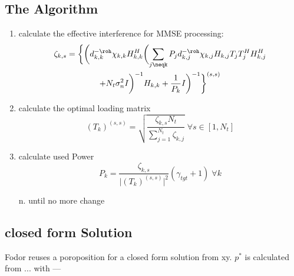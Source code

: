 \subsection{The Algorithm}
\begin{enumerate}
	\item calculate the effective interference for MMSE processing:
		\begin{multline}
			\zeta_{k,s} = \biggl\{\biggl(d^{-\roh}_{k,k}\chi_{k,k}H^H_{k,k}\biggl(\sum_{j\neqk}{P_jd^{-\roh}_{k,j}\chi_{k,j}H_{k,j}T_jT_j^HH^H_{k,j}}\\
			+N_t\sigma^2_nI\biggr)^{-1}H_{k,k}+\frac{1}{P_k}I\biggr)^{-1}\biggr\}^{(s,s)}
		\end{multline}

	\item calculate the optimal loading matrix
		\begin{equation}
			(T_k)^{(s,s)} = \sqrt{\frac{\zeta_{k,s}N_t}{\sum_{j=1}^{N_t}\zeta_{k,j}}}\;\forall s\in[1,N_t]
		\end{equation}

	\item calculate used Power
		\begin{equation}
			P_k = \frac{\zeta_{k,s}}{\vert(T_k)^{(s,s)}\vert^2}(\gamma_{tgt}+1)\;\forall k
		\end{equation}

	\item[n.] until no more change

\end{enumerate}

\subsection{closed form Solution}
Fodor reuses a poroposition for a closed form solution from xy.
$p^*$ is calculated from ... with ---